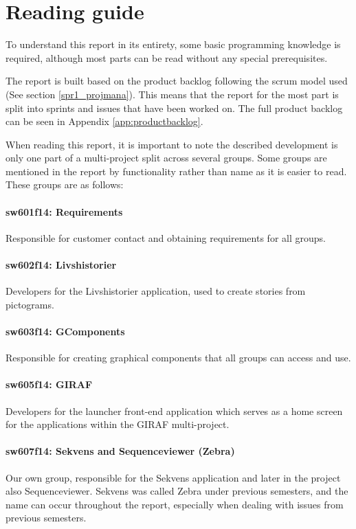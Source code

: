 \section*{Reading guide}

To understand this report in its entirety, some basic programming knowledge is required, although most parts can be read without any special prerequisites.

The report is built based on the product backlog following the scrum model used (See section \ref{spr1_projmana}). This means that the report for the most part is split into sprints and issues that have been worked on. The full product backlog can be seen in Appendix \ref{app:productbacklog}.

When reading this report, it is important to note the  described development is only one part of a multi-project split across several groups. Some groups are mentioned in the report by functionality rather than name as it is easier to read. These groups are as follows:

\paragraph{sw601f14: Requirements}
Responsible for customer contact and obtaining requirements for all groups.
\paragraph{sw602f14: Livshistorier}
Developers for the Livshistorier application, used to create stories from pictograms.
\paragraph{sw603f14: GComponents}
Responsible for creating graphical components that all groups can access and use.
\paragraph{sw605f14: GIRAF}
Developers for the launcher front-end application which serves as a home screen for the applications within the GIRAF multi-project.
\paragraph{sw607f14: Sekvens and Sequenceviewer (Zebra)}
Our own group, responsible for the Sekvens application and later in the project also Sequenceviewer. Sekvens was called Zebra under previous semesters, and the name can occur throughout the report, especially when dealing with issues from previous semesters.
